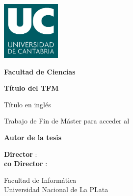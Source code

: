 \begin{titlepage}
\begin{center}

\includegraphics[height=2.91cm]{imagenes/logo_uc.png}
\vspace{0.4cm}

\textbf{Facultad de Ciencias}

\vspace{1cm}

\LARGE
\textbf{Título del TFM}

Título en inglés

\vspace{1.cm}
Trabajo de Fin de Máster
para acceder al

\vspace{0.5cm}
\textbf{Autor de la tesis}

\vspace{0.3cm}
\small
\textbf{Director }: \\
\textbf{co Director }: 




\Large
Facultad de Informática\\
Universidad Nacional de La PLata
\end{center}
\end{titlepage}